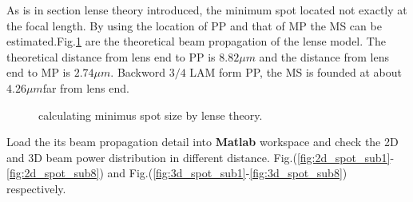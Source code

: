 As is in section lense theory introduced, the minimum spot located not exactly at the focal length. By using the location of PP and that of MP the MS can be estimated.Fig.\ref{fig:lens_spot} are the theoretical beam propagation of the lense model. The theoretical distance from lens end to PP is $8.82 \mu m$ and the distance from lens end to MP is  $2.74 \mu m$. Backword $3/4$ LAM form PP, the MS is founded at about $4.26 \mu m$far from lens end. 
\begin{figure}
\centering
{}
\hfill
{}
\label{fig:lens_spot}
\caption{calculating minimus spot size by lense theory.}
\end{figure}
Load the its beam propagation detail into \textbf{Matlab} workspace and check the 2D and 3D beam power distribution in different distance. Fig.(\ref{fig:2d_spot_sub1}-\ref{fig:2d_spot_sub8}) and Fig.(\ref{fig:3d_spot_sub1}-\ref{fig:3d_spot_sub8}) respectively.%
